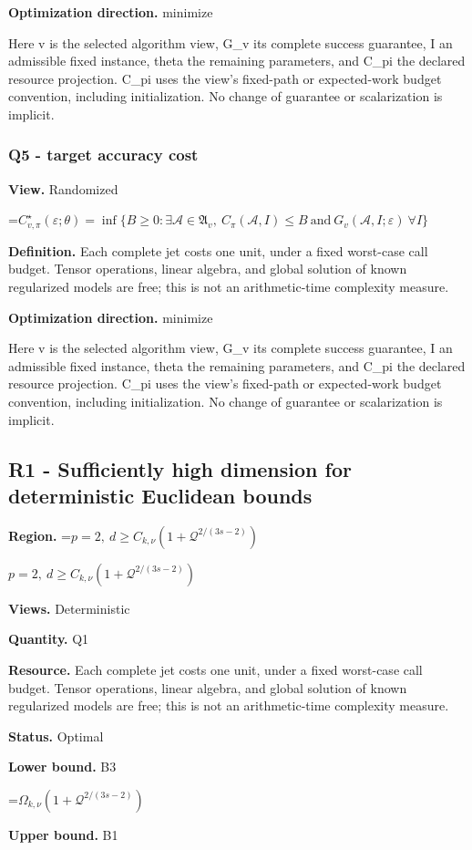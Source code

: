 \documentclass[10pt,a4paper]{article}
\newcommand{\AtlasMath}[1]{\par\begingroup\centering\setbox0=\hbox{$\displaystyle #1$}\ifdim\wd0>1.4\linewidth\typeout{ATLAS WIDE FORMULA: \the\wd0}\fi\ifdim\wd0>\linewidth\resizebox{\linewidth}{!}{\box0}\else\box0\fi\par\endgroup}
\newcommand{\AtlasInlineMath}[1]{\begingroup\setbox0=\hbox{$#1$}\ifdim\wd0>.4\linewidth\endgroup\AtlasMath{#1}\else\endgroup$#1$\fi}
\begin{document}
\textbf{Optimization direction.} minimize

Here v is the selected algorithm view, G\_v its complete success guarantee, I an admissible fixed instance, theta the remaining parameters, and C\_pi the declared resource projection. C\_pi uses the view's fixed-path or expected-work budget convention, including initialization. No change of guarantee or scalarization is implicit.

\subsubsection{Q5 - target accuracy cost}
\textbf{View.} Randomized

\AtlasMath{C^\star_{v,\pi}(\varepsilon;\theta)=\inf\{B\ge0:\exists\mathcal A\in\mathfrak A_v,\ C_\pi(\mathcal A,I)\le B\ \text{and}\ G_v(\mathcal A,I;\varepsilon)\ \forall I\}}
\textbf{Definition.} Each complete jet costs one unit, under a fixed worst-case call budget. Tensor operations, linear algebra, and global solution of known regularized models are free; this is not an arithmetic-time complexity measure.

\textbf{Optimization direction.} minimize

Here v is the selected algorithm view, G\_v its complete success guarantee, I an admissible fixed instance, theta the remaining parameters, and C\_pi the declared resource projection. C\_pi uses the view's fixed-path or expected-work budget convention, including initialization. No change of guarantee or scalarization is implicit.

\subsection{R1 - Sufficiently high dimension for deterministic Euclidean bounds}
\textbf{Region.} \AtlasInlineMath{p=2,\ d\ge C_{k,\nu}(1+\mathcal{Q}^{2/(3s-2)})}

\textbf{Views.} Deterministic

\textbf{Quantity.} Q1

\textbf{Resource.} Each complete jet costs one unit, under a fixed worst-case call budget. Tensor operations, linear algebra, and global solution of known regularized models are free; this is not an arithmetic-time complexity measure.

\textbf{Status.} Optimal

\textbf{Lower bound.} B3

\AtlasMath{\Omega_{k,\nu}(1+\mathcal{Q}^{2/(3s-2)})}
\textbf{Upper bound.} B1
\end{document}
